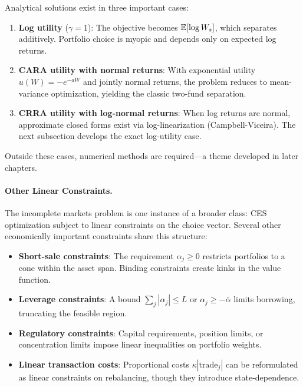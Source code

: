\begin{calloutnote}
Analytical solutions exist in three important cases:
\begin{enumerate}[label=(\roman*), nosep]
    \item \textbf{Log utility} ($\gamma = 1$): The objective becomes $\mathbb{E}[\log W_s]$, which separates additively. Portfolio choice is myopic and depends only on expected log returns.
    
    \item \textbf{CARA utility with normal returns}: With exponential utility $u(W) = -e^{-aW}$ and jointly normal returns, the problem reduces to mean-variance optimization, yielding the classic two-fund separation.
    
    \item \textbf{CRRA utility with log-normal returns}: When log returns are normal, approximate closed forms exist via log-linearization (Campbell-Viceira). The next subsection develops the exact log-utility case.
\end{enumerate}
Outside these cases, numerical methods are required---a theme developed in later chapters.
\end{calloutnote}

\paragraph{Other Linear Constraints.}

The incomplete markets problem is one instance of a broader class: CES optimization subject to linear constraints on the choice vector. Several other economically important constraints share this structure:
\begin{itemize}[nosep]
    \item \textbf{Short-sale constraints}: The requirement $\alpha_j \geq 0$ restricts portfolios to a cone within the asset span. Binding constraints create kinks in the value function.
    
    \item \textbf{Leverage constraints}: A bound $\sum_j |\alpha_j| \leq L$ or $\alpha_j \geq -\bar{\alpha}$ limits borrowing, truncating the feasible region.
    
    \item \textbf{Regulatory constraints}: Capital requirements, position limits, or concentration limits impose linear inequalities on portfolio weights.
    
    \item \textbf{Linear transaction costs}: Proportional costs $\kappa |\text{trade}_j|$ can be reformulated as linear constraints on rebalancing, though they introduce state-dependence.
\end{itemize}


